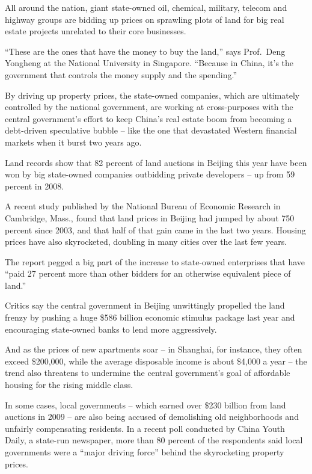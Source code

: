 ﻿\documentclass[12pt]{article}
\begin{document}
All around the nation, giant state-owned oil, chemical, military, telecom and highway groups are
bidding up prices on sprawling plots of land for big real estate projects unrelated to their core
businesses.

``These are the ones that have the money to buy the land,'' says Prof.~Deng Yongheng at the National
University in Singapore. ``Because in China, it's the government that controls the money supply and
the spending.''

By driving up property prices, the state-owned companies, which are ultimately controlled by the
national government, are working at cross-purposes with the central government's effort to keep
China's real estate boom from becoming a debt-driven speculative bubble -- like the one that
devastated Western financial markets when it burst two years ago.

Land records show that 82 percent of land auctions in Beijing this year have been won by big
state-owned companies outbidding private developers -- up from 59 percent in 2008.

A recent study published by the National Bureau of Economic Research in Cambridge, Mass., found that
land prices in Beijing had jumped by about 750 percent since 2003, and that half of that gain came
in the last two years. Housing prices have also skyrocketed, doubling in many cities over the last
few years.

The report pegged a big part of the increase to state-owned enterprises that have ``paid 27 percent
more than other bidders for an otherwise equivalent piece of land.''

Critics say the central government in Beijing unwittingly propelled the land frenzy by pushing a
huge \$586 billion economic stimulus package last year and encouraging state-owned banks to lend
more aggressively.

And as the prices of new apartments soar -- in Shanghai, for instance, they often exceed \$200,000,
while the average disposable income is about \$4,000 a year -- the trend also threatens to undermine
the central government's goal of affordable housing for the rising middle class.

In some cases, local governments -- which earned over \$230 billion from land auctions in 2009 --
are also being accused of demolishing old neighborhoods and unfairly compensating residents. In a
recent poll conducted by China Youth Daily, a state-run newspaper, more than 80 percent of the
respondents said local governments were a ``major driving force'' behind the skyrocketing property
prices.
\end{document}
